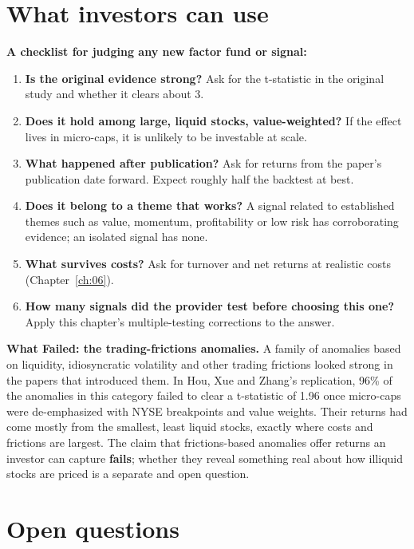 \section{What investors can use}
\label{sec:10-investors}

\textbf{A checklist for judging any new factor fund or signal:}

\begin{enumerate}
  \item \textbf{Is the original evidence strong?} Ask for the t-statistic in the original study and whether it clears about 3.
  \item \textbf{Does it hold among large, liquid stocks, value-weighted?} If the effect lives in micro-caps, it is unlikely to be investable at scale.
  \item \textbf{What happened after publication?} Ask for returns from the paper's publication date forward. Expect roughly half the backtest at best.
  \item \textbf{Does it belong to a theme that works?} A signal related to established themes such as value, momentum, profitability or low risk has corroborating evidence; an isolated signal has none.
  \item \textbf{What survives costs?} Ask for turnover and net returns at realistic costs (Chapter~\ref{ch:06}).
  \item \textbf{How many signals did the provider test before choosing this one?} Apply this chapter's multiple-testing corrections to the answer.
\end{enumerate}

\begin{callout}
\textbf{What Failed: the trading-frictions anomalies.} A family of anomalies based on liquidity, idiosyncratic volatility and other trading frictions looked strong in the papers that introduced them. In Hou, Xue and Zhang's replication, 96\% of the anomalies in this category failed to clear a t-statistic of 1.96 once micro-caps were de-emphasized with NYSE breakpoints and value weights. Their returns had come mostly from the smallest, least liquid stocks, exactly where costs and frictions are largest. The claim that frictions-based anomalies offer returns an investor can capture \textbf{fails}; whether they reveal something real about how illiquid stocks are priced is a separate and open question.
\end{callout}

\section{Open questions}
\label{sec:10-open}

